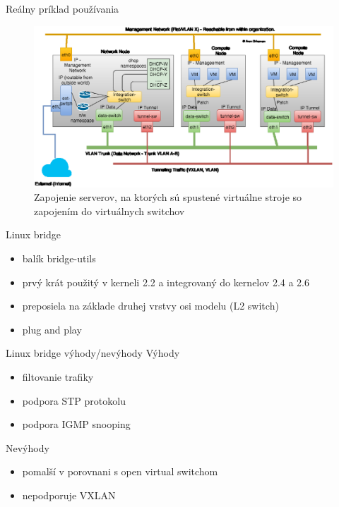 \documentclass{beamer}
\begin{document}
	\begin{frame}{Reálny príklad používania}
		\begin{figure}
		
			\includegraphics[scale=0.4]{private-cloud.eps}
			\caption{Zapojenie serverov, na ktorých sú spustené virtuálne stroje so zapojením do virtuálnych switchov}
		\end{figure}
	\end{frame}

	\begin{frame}{Linux bridge}
		\begin{itemize}
			\item{balík bridge-utils}
			\item{prvý krát použitý v kerneli 2.2 a integrovaný do kernelov 2.4 a 2.6}
			\item{preposiela na základe druhej vrstvy osi modelu (L2 switch)}
			\item{plug and play}
		\end{itemize}
	\end{frame}

	\begin{frame}{Linux bridge výhody/nevýhody}
		Výhody
		\begin{itemize}
			\item{filtovanie trafiky}
			\item{podpora STP protokolu}
			\item{podpora IGMP snooping}
		\end{itemize}
		Nevýhody
		\begin{itemize}
			\item{pomalší v porovnani s open virtual switchom}
			\item{nepodporuje VXLAN}
		\end{itemize}
	\end{frame}
\end{document}
